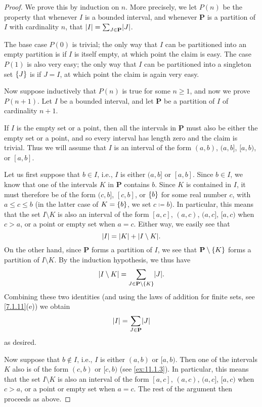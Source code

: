 \begin{proof}
  We prove this by induction on \(n\).
  More precisely, we let \(P(n)\) be the property that whenever \(I\) is a bounded interval, and whenever \(\mathbf{P}\) is a partition of \(I\) with cardinality \(n\), that \(\abs{I} = \sum_{J \in \mathbf{P}} \abs{J}\).

  The base case \(P(0)\) is trivial;
  the only way that \(I\) can be partitioned into an empty partition is if \(I\) is itself empty, at which point the claim is easy.
  The case \(P(1)\) is also very easy;
  the only way that \(I\) can be partitioned into a singleton set \(\left\lbrace J\right\rbrace\) is if \(J = I\), at which point the claim is again very easy.

  Now suppose inductively that \(P(n)\) is true for some \(n \geq 1\), and now we prove \(P(n + 1)\).
  Let \(I\) be a bounded interval, and let \(\mathbf{P}\) be a partition of \(I\) of cardinality \(n + 1\).

  If \(I\) is the empty set or a point, then all the intervals in \(\mathbf{P}\) must also be either the empty set or a point, and so every interval has length zero and the claim is trivial.
  Thus we will assume that \(I\) is an interval of the form \((a, b)\), \((a, b]\), \([a, b)\), or \([a, b]\).

      Let us first suppose that \(b \in I\), i.e., \(I\) is either \((a, b]\) or \([a, b]\).
  Since \(b \in I\), we know that one of the intervals \(K\) in \(\mathbf{P}\) contains \(b\).
  Since \(K\) is contained in \(I\), it must therefore be of the form \((c, b]\), \([c, b]\), or \(\left\lbrace b\right\rbrace\) for some real number \(c\), with \(a \leq c \leq b\) (in the latter case of \(K = \left\lbrace b\right\rbrace\), we set \(c \coloneqq b\)).
  In particular, this means that the set \(I \setminus K\) is also an interval of the form \([a, c]\), \((a, c)\), \((a, c]\), \([a, c)\) when \(c > a\), or a point or empty set when \(a = c\).
  Either way, we easily see that
  \[
    \abs{I} = \abs{K} + \abs{I \setminus K}.
  \]
  On the other hand, since \(\mathbf{P}\) forms a partition of \(I\), we see that \(\mathbf{P} \setminus \left\lbrace K\right\rbrace\) forms a partition of \(I \setminus K\).
  By the induction hypothesis, we thus have
  \[
    \abs{I \setminus K} = \sum_{J \in \mathbf{P} \setminus \set{K}} \abs{J}.
  \]
  Combining these two identities (and using the laws of addition for finite sets, see \cref{7.1.11}(e)) we obtain
  \[
    \abs{I} = \sum_{J \in \mathbf{P}} \abs{J}
  \]
  as desired.

  Now suppose that \(b \notin I\), i.e., \(I\) is either \((a, b)\) or \([a, b)\).
  Then one of the intervals \(K\) also is of the form \((c, b)\) or \([c, b)\) (see \cref{ex:11.1.3}).
      In particular, this means that the set \(I \setminus K\) is also an interval of the form \([a, c]\), \((a, c)\), \((a, c]\), \([a, c)\) when \(c > a\), or a point or empty set when \(a = c\).
  The rest of the argument then proceeds as above.
\end{proof}

